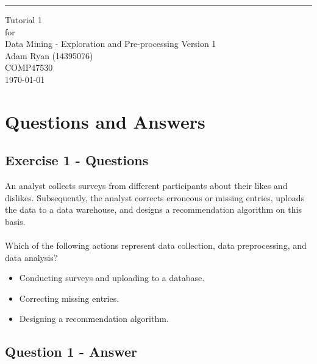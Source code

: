 \documentclass{scrreprt}
\date{}
\def\myversion{1 }
\begin{document}
	
	\begin{flushright}
		\rule{16cm}{5pt}\vskip1cm
		\begin{bfseries}
			\Huge{Tutorial 1\\}
			\vspace{1.9cm}
			for\\
			\vspace{1.9cm}
			Data Mining - Exploration and Pre-processing
			\vspace{1.9cm}
			\LARGE{Version \myversion}\\
			\vspace{1.9cm}
			Adam Ryan (14395076)\\
			\vspace{1.9cm}
			COMP47530\\
			\vspace{1.9cm}
			\today\\
		\end{bfseries}
	\end{flushright}
	
	\tableofcontents
	
	\chapter{Questions and Answers}\label{Intro}
	
	
\section{Exercise 1 - Questions}\label{E1Q}
An analyst collects surveys from different participants about their likes and dislikes.
Subsequently, the analyst corrects erroneous or missing entries, uploads the data to a data warehouse, and designs a recommendation algorithm on this basis.
\\
\\
Which of the following actions represent data collection, data preprocessing, and data analysis?
\begin{itemize}
\item Conducting surveys and uploading to a database.
\item Correcting missing entries.
\item Designing a recommendation algorithm.
\end{itemize}

	
\section{Question 1 - Answer}
\end{document}
